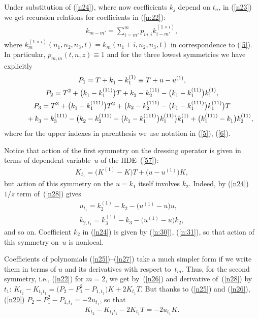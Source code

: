 \documentclass[pdftex]{sigma}
\numberwithin{equation}{section}
\begin{document}
Under substitution of (\ref{n24}), where now coef\/f\/icients $k_{j}$ depend on $t_n$, in (\ref{n23}) we get recursion relations for coef\/f\/icients in (\ref{n:22}):
\begin{gather*}
 k_{m-m'}=\sum_{i=m'}^{m}p_{m,i}k_{i-m'}^{(1\times{i})},%
\end{gather*}
where $k_{m}^{(1\times{i})}(n_1,n_2,n_3,t)=k_{m}^{}(n_1+i,n_2,n_3,t)$ in correspondence to (\ref{5}). In particular, $p_{m,m}(t,n,z)\equiv1$ and for the three lowest symmetries we have explicitly
\begin{gather}
P_{1}=T+k_{1}^{}-k_{1}^{(1)}\equiv T+u-u^{(1)},\label{n25}\\
P_{2}=T^{2}+\big(k_{1}^{}-k_{1}^{(11)}\big)T+k_{2}^{}-k_{2}^{(11)}-\big(k_{1}^{}-k_{1}^{(11)}\big)k_{1}^{(1)},\label{n26}\\
P_{3}=T^{3}+\big(k_{1}^{}-k_{1}^{(111)}\big)T^{2}+\big(k_{2}-k_{2}^{(111)}-\big(k_{1}^{}-k_{1}^{(111)}\big)k_{1}^{(11)}\big)T\nonumber\\
\hphantom{P_{3}=}{}
+k_{3}^{}-k_{3}^{(111)}-\big(k_{2}^{}-k_{2}^{(111)}-\big(k_{1}^{}-k_{1}^{(111)}\big) k_{1}^{(11)}\big)k_{1}^{(1)}+\big(k_{1}^{(111)}-k_{1}^{}\big)k_{2}^{(11)},\label{n27}
\end{gather}
where for the upper indexes in parenthesis we use notation in (\ref{5}), (\ref{6}).

Notice that action of the f\/irst symmetry on the dressing operator is given in terms of dependent variable~$u$ of the HDE~(\ref{57}):
\begin{gather}
K_{t_1}=\big(K^{(1)}-K\big)T+\big(u-u^{(1)}\big)K,\label{n28}
\end{gather}
but action of this symmetry on the $u=k_{1}$ itself involves $k_{2}$. Indeed, by (\ref{n24}) $1/z$ term of~(\ref{n28}) gives
\begin{gather}
u_{t_1}=k_{2}^{(1)}-k_{2}^{}-\big(u^{(1)}-u\big)u,\label{n29}\\
k_{2,t_1}=k_{3}^{(1)}-k_{3}^{}-\big(u^{(1)}-u\big)k_{2},\label{n291}
\end{gather}
and so on. Coef\/f\/icient $k_{2}$ in (\ref{n24}) is given by (\ref{n:30}), (\ref{n:31}), so that action of this symmetry on~$u$ is nonlocal.

Coef\/f\/icients of polynomials (\ref{n25})--(\ref{n27}) take a much simpler form if we write them in terms of $u$ and its derivatives with respect to~$t_m$. Thus, for the second symmetry, i.e., (\ref{n22}) for $m=2$, we get by~(\ref{n26}) and derivative of~(\ref{n28}) by~$t_1$: $K_{t_2}-K_{t_1t_1}=\big(P_2^{}-P_{1}^{2}-P_{1,t_1}^{}\big)K+2K_{t_1}T$. But thanks to (\ref{n25}) and (\ref{n26}), (\ref{n29}) $P_2^{}-P_{1}^{2}-P_{1,t_1}^{}=-2u_{t_1}$, so that
\begin{gather*}
 K_{t_2}-K_{t_1t_1}-2K_{t_1}T=-2u_{t_1}K.%
\end{gather*}
\end{document}
